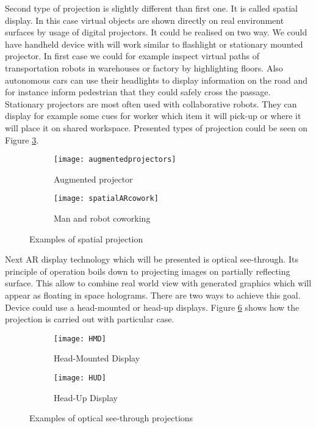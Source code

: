 \documentclass[printmode,en]{mgr}
\begin{document}
Second type of projection is slightly different than first one. It is called spatial display. In this case virtual objects are shown directly on real environment surfaces by usage of digital projectors. It could be realised on two way. We could have handheld device with will work similar to flashlight or stationary mounted projector. In first case we could for example inspect virtual paths of transportation robots in warehouses or factory by highlighting floors. Also autonomous cars can use their headlights to display information on the road and for instance inform pedestrian that they could safely cross the passage. Stationary projectors are most often used with collaborative robots. They can display for example some cues for worker which item it will pick-up or where it will place it on shared workspace. Presented types of projection could be seen on Figure \ref{fig:spatialAR}.

\begin{figure}[!ht]
\centering
\begin{subfigure}{.4\textwidth}
  \centering
  \texttt{[image: augmentedprojectors]}
  \caption{Augmented projector}
  \label{fig:augmentedprojectors}
\end{subfigure}%
\begin{subfigure}{.4\textwidth}
  \centering
  \texttt{[image: spatialARcowork]}
  \caption{Man and robot coworking}
  \label{fig:spatialARcowork}
\end{subfigure}
\caption{Examples of spatial projection}
\label{fig:spatialAR}
\end{figure}

Next AR display technology which will be presented is optical see-through. Its principle of operation boils down to projecting images on partially reflecting surface. This allow to combine real world view with generated graphics which will appear as floating in space holograms. There are two ways to achieve this goal. Device could use a head-mounted or head-up displays. Figure \ref{fig:seeThroughAR} shows how the projection is carried out with particular case.

\begin{figure}[!ht]
\centering
\begin{subfigure}{.5\textwidth}
  \centering
  \texttt{[image: HMD]}
  \caption{Head-Mounted Display}
  \label{fig:headMounted}
\end{subfigure}%
\begin{subfigure}{.5\textwidth}
  \centering
  \texttt{[image: HUD]}
  \caption{Head-Up Display}
  \label{fig:headUp}
\end{subfigure}
\caption{Examples of optical see-through projections}
\label{fig:seeThroughAR}
\end{figure}
\end{document}
